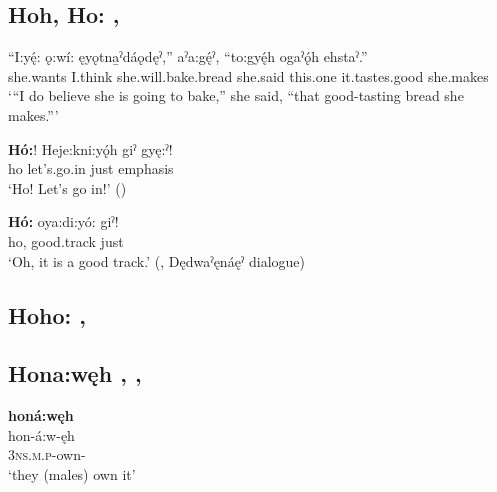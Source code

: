 \subsection*{\textbf{Hoh, Ho:} , } \label{p:[hoh, ho:]}

\ea
\label{ex:hpar50}

\gll “I:yę́: ǫ:wí: ęyǫtna̱ˀdáǫdęˀ,” aˀa:gę́ˀ, “to:gyę́h ogaˀǫ́h ehstaˀ.”\\
she.wants I.think she.will.bake.bread she.said this.one it.tastes.good she.makes\\
\glt ‘“I do believe she is going to bake,” she said, “that good-tasting bread she makes.”’


\gll \textbf{Hó:}! Heje:kni:yǫ́h giˀ gyę:ˀ!\\
ho let’s.go.in just emphasis\\
\glt ‘Ho! Let’s go in!’
(\cite{henry_de_2005})

\z

\ea
\label{ex:hpar51}
\gll \textbf{Hó:} oya:di:yó: giˀ!\\
ho, good.track just\\
\glt ‘Oh, it is a good track.’ (\cite[481]{mithun_watewayestanih_1984}, Dędwaˀęnáęˀ dialogue)
\z


\subsection*{\textbf{Hoho:} , } \label{p:[hoho:]}




\subsection*{\textbf{Hona:węh} , , } \label{p:[hona:węh]}

\ea
\label{ex:hpar55} \textbf{honá:węh}\\
\gll hon-á:w-ęh\\
\textsc{3ns.m.p}-own-{\stative}\\
\glt ‘they (males) own it’
\z



